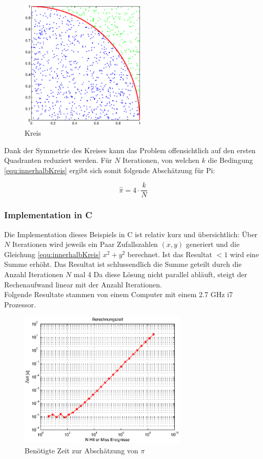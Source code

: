\documentclass{book}
\begin{document}
\begin{refsection}
\begin{figure}[htbp]
	\centering
	\includegraphics[width=6cm]{images/kreis_hitmiss.eps}
	\caption{Kreis}
	\label{fig:KreisHitMiss}
\end{figure}

Dank der Symmetrie des Kreises kann das Problem offensichtlich auf den ersten Quadranten reduziert werden. Für $N$ Iterationen, von welchen $k$ die Bedingung \ref{equ:innerhalbKreis} ergibt sich somit folgende Abschätzung für Pi:

\begin{equation}
	\hat{\pi} = 4 \cdot \frac{k}{N}
\end{equation}

\subsubsection{Implementation in C}
Die Implementation dieses Beispiels in C ist relativ kurz und übersichtlich: Über $N$ Iterationen wird jeweils ein Paar Zufallszahlen $(x,y)$ generiert und die Gleichung \ref{equ:innerhalbKreis} $x^2 + y^2$ berechnet. Ist das Resultat $<1$ wird eine Summe erhöht. Das Resultat ist schlussendlich die Summe geteilt durch die Anzahl Iterationen $N$ mal 4 Da diese Lösung nicht parallel abläuft, steigt der Rechenaufwand linear mit der Anzahl Iterationen. \\

Folgende Resultate stammen von einem Computer mit einem 2.7 GHz i7 Prozessor. 

\begin{figure}[h]
    \centering
    \includegraphics[width=8cm]{images/Berechnungszeit.eps}
    \caption{Benötigte Zeit zur Abschätzung von $\pi$}
    \label{fig:Berechnungszeit}
\end{figure}


\end{refsection}
\end{document}
